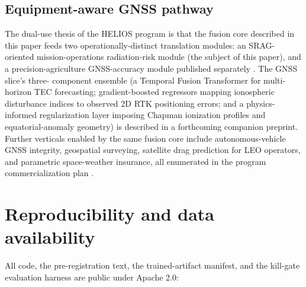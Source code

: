 \documentclass[11pt,letterpaper]{article}
\begin{document}
\subsection{Equipment-aware GNSS pathway}

The dual-use thesis of the HELIOS program is that the fusion core
described in this paper feeds two operationally-distinct translation
modules: an SRAG-oriented mission-operations radiation-risk module
(the subject of this paper), and a precision-agriculture GNSS-accuracy
module published separately \cite{gannon_rtk}.  The GNSS slice's three-
component ensemble (a Temporal Fusion Transformer \cite{lim2021} for
multi-horizon TEC forecasting; gradient-boosted regressors mapping
ionospheric disturbance indices to observed 2D RTK positioning errors;
and a physics-informed regularization layer imposing Chapman ionization
profiles and equatorial-anomaly geometry) is described in a forthcoming
companion preprint.  Further verticals enabled by the same
fusion core include autonomous-vehicle GNSS integrity, geospatial
surveying, satellite drag prediction for LEO operators, and parametric
space-weather insurance, all enumerated in the program commercialization
plan \cite{helios_program}.

\section{Reproducibility and data availability}
\label{sec:repro}

All code, the pre-registration text, the trained-artifact manifest, and
the kill-gate evaluation harness are public under Apache 2.0:
\end{document}
